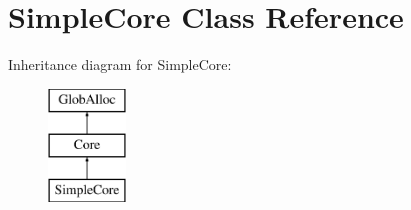 \hypertarget{classSimpleCore}{\section{Simple\-Core Class Reference}
\label{classSimpleCore}
}
Inheritance diagram for Simple\-Core\-:\begin{figure}[H]
\begin{center}
\leavevmode
\includegraphics[height=3.000000cm]{classSimpleCore}
\end{center}
\end{figure}
